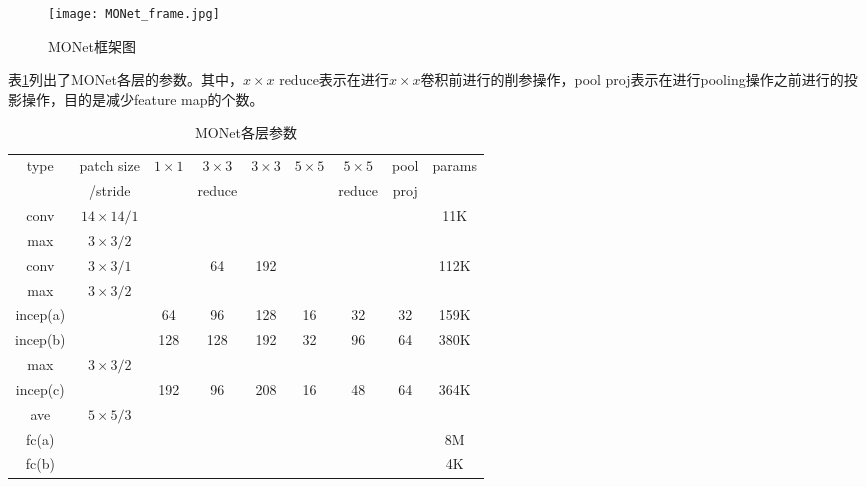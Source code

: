 \begin{figure}
	\centering
	\texttt{[image: MONet\_frame.jpg]}
	\caption{MONet框架图}\label{fig:monet_f}
\end{figure}

表\ref{tab:monet}列出了MONet各层的参数。其中，$x\times x$ reduce表示在进行$x\times x$卷积前进行的削参操作，pool proj表示在进行pooling操作之前进行的投影操作，目的是减少feature map的个数。
\begin{table}
	\begin{center}
		\begin{tabular}{|c|c|c|c|c|c|c|c|c|}
			\hline
			type & patch size & $1\times1$ & $3\times3$ & $3\times3$ & $5\times5$ & $5\times5$ & pool & params \\
			     & /stride    &            & reduce     &            &            &     reduce & proj &        \\
			\hline
			\hline
			conv & $14\times14/1$ & & & & & & & 11K\\
			\hline
			max  & $3\times3/2$ & & & & & & & \\
			\hline
			conv & $3\times3/1$ & & 64 & 192 & & & & 112K\\
			\hline
			max  & $3\times3/2$ & & & & & & &\\
			\hline
			incep(a) & & 64 & 96 & 128 & 16 & 32 & 32 & 159K\\
			\hline
			incep(b) & & 128 & 128 & 192 & 32 & 96 & 64 & 380K\\
			\hline
			max  & $3\times3/2$ & & & & & & &\\
			\hline
			incep(c) & & 192 & 96 & 208 & 16 & 48 & 64& 364K\\
			\hline
			ave & $5\times5/3$ & & & & & & &\\
			\hline
			fc(a) & & & & & & & & 8M\\
			\hline
			fc(b) & & & & & & & & 4K\\
			\hline
		\end{tabular}
	\end{center}
	\caption{MONet各层参数}
	\label{tab:monet}
\end{table}


